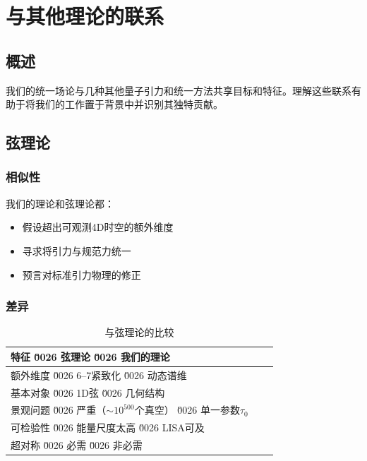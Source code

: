 \section{与其他理论的联系}
\label{sec:connections}

\subsection{概述}

我们的统一场论与几种其他量子引力和统一方法共享目标和特征。理解这些联系有助于将我们的工作置于背景中并识别其独特贡献。

\subsection{弦理论}

\subsubsection{相似性}

我们的理论和弦理论都：
\begin{itemize}
    \item 假设超出可观测4D时空的额外维度
    \item 寻求将引力与规范力统一
    \item 预言对标准引力物理的修正
\end{itemize}

\subsubsection{差异}

\begin{table}[htbp]
\centering
\caption{与弦理论的比较}
\label{tab:string_comparison}
\begin{tabular}{p{4cm}p{4cm}p{4cm}}
\toprule
\textbf{特征} \u0026 \textbf{弦理论} \u0026 \textbf{我们的理论} \\
\midrule
额外维度 \u0026 6--7紧致化 \u0026 动态谱维 \\
基本对象 \u0026 1D弦 \u0026 几何结构 \\
景观问题 \u0026 严重（$\sim 10^{500}$个真空） \u0026 单一参数$\tau_0$ \\
可检验性 \u0026 能量尺度太高 \u0026 LISA可及 \\
超对称 \u0026 必需 \u0026 非必需 \\
\bottomrule
\end{tabular}
\end{table}

